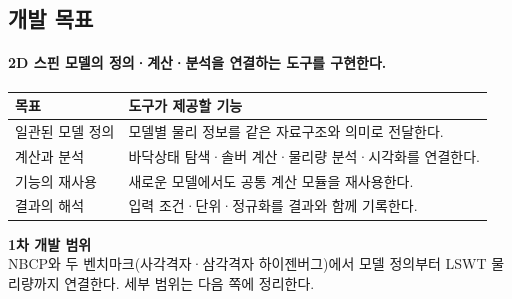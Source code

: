 \subsection{개발 목표}\label{development-goals}
\begingroup%
  \framesubtitle{2D 스핀 모델의 정의·계산·분석을 연결하는 도구를 구현한다.}
  \begin{tabularx}{\textwidth}{@{}p{2.7cm}Y@{}}
    \toprule
    목표 & 도구가 제공할 기능 \\
    \midrule
    일관된 모델 정의 & 모델별 물리 정보를 같은 자료구조와 의미로 전달한다. \\
    계산과 분석 & 바닥상태 탐색·솔버 계산·물리량 분석·시각화를 연결한다. \\
    기능의 재사용 & 새로운 모델에서도 공통 계산 모듈을 재사용한다. \\
    결과의 해석 & 입력 조건·단위·정규화를 결과와 함께 기록한다. \\
    \bottomrule
  \end{tabularx}
  \par\medskip
  \textbf{1차 개발 범위}\\[0.4em]
  NBCP와 두 벤치마크(사각격자·삼각격자 하이젠버그)에서 모델 정의부터
  LSWT 물리량까지 연결한다. 세부 범위는 다음 쪽에 정리한다.
  \par\medskip
\endgroup


